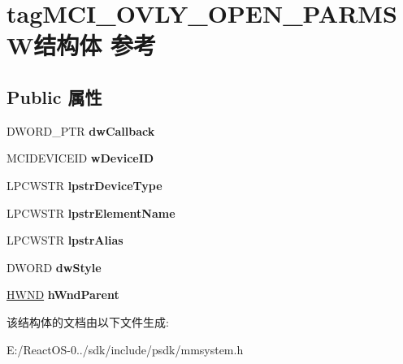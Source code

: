 \hypertarget{structtag_m_c_i___o_v_l_y___o_p_e_n___p_a_r_m_s_w}{}\section{tag\+M\+C\+I\+\_\+\+O\+V\+L\+Y\+\_\+\+O\+P\+E\+N\+\_\+\+P\+A\+R\+M\+S\+W结构体 参考}
\label{structtag_m_c_i___o_v_l_y___o_p_e_n___p_a_r_m_s_w}
\subsection*{Public 属性}
\begin{DoxyCompactItemize}
\item 
\mbox{\label{structtag_m_c_i___o_v_l_y___o_p_e_n___p_a_r_m_s_w_a614b266b7e52a2be47d85655734eb2cc}} 
D\+W\+O\+R\+D\+\_\+\+P\+TR {\bfseries dw\+Callback}
\item 
\mbox{\label{structtag_m_c_i___o_v_l_y___o_p_e_n___p_a_r_m_s_w_ac0d199a5847b447d1b17c1e36e1d6725}} 
M\+C\+I\+D\+E\+V\+I\+C\+E\+ID {\bfseries w\+Device\+ID}
\item 
\mbox{\label{structtag_m_c_i___o_v_l_y___o_p_e_n___p_a_r_m_s_w_afef664a7a9c85e3aff7f82eb99f8fa7a}} 
L\+P\+C\+W\+S\+TR {\bfseries lpstr\+Device\+Type}
\item 
\mbox{\label{structtag_m_c_i___o_v_l_y___o_p_e_n___p_a_r_m_s_w_ac12a7a258c45571197b9ae8b90bf0f39}} 
L\+P\+C\+W\+S\+TR {\bfseries lpstr\+Element\+Name}
\item 
\mbox{\label{structtag_m_c_i___o_v_l_y___o_p_e_n___p_a_r_m_s_w_a414d029ba60e01698ad37b0529464e99}} 
L\+P\+C\+W\+S\+TR {\bfseries lpstr\+Alias}
\item 
\mbox{\label{structtag_m_c_i___o_v_l_y___o_p_e_n___p_a_r_m_s_w_a662360f063644bbc55d5a49af0197b76}} 
D\+W\+O\+RD {\bfseries dw\+Style}
\item 
\mbox{\label{structtag_m_c_i___o_v_l_y___o_p_e_n___p_a_r_m_s_w_af8dbbd05557029cd1d788bec5cb28e31}} 
\hyperlink{interfacevoid}{H\+W\+ND} {\bfseries h\+Wnd\+Parent}
\end{DoxyCompactItemize}


该结构体的文档由以下文件生成\+:\begin{DoxyCompactItemize}
\item 
E\+:/\+React\+O\+S-\/0../sdk/include/psdk/mmsystem.\+h\end{DoxyCompactItemize}
